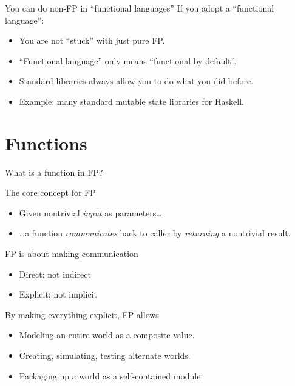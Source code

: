 \begin{frame}{You can do non-FP in ``functional languages''}
  If you adopt a ``functional language'':
  \begin{itemize}
  \item You are not ``stuck'' with just pure FP.
  \item ``Functional language'' only means ``functional by default''.
  \item Standard libraries always allow you to do what you did before.
  \item Example: many standard mutable state libraries for Haskell.
  \end{itemize}
\end{frame}

\section{Functions}


\begin{frame}{What is a function in FP?}
  \begin{block}{The core concept for FP}
    \begin{itemize}
    \item Given nontrivial \emph{input} as parameters\ldots{}
    \item \ldots{}a function \emph{communicates} back to caller by \emph{returning} a nontrivial result.
    \end{itemize}
  \end{block}

  FP is about making communication
  \begin{itemize}
  \item Direct; not indirect
  \item Explicit; not implicit
  \end{itemize}

  By making everything explicit, FP allows
  \begin{itemize}
  \item Modeling an entire world as a composite value.
  \item Creating, simulating, testing alternate worlds.
  \item Packaging up a world as a self-contained module.
  \end{itemize}
\end{frame}

